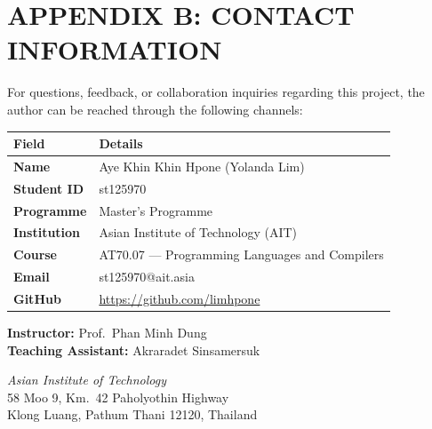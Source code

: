\chapter*{APPENDIX B: CONTACT INFORMATION}

For questions, feedback, or collaboration inquiries regarding this project, the author can be reached through the following channels:

\vspace{1cm}

\begin{table}[h!]
\centering
\renewcommand{\arraystretch}{1.5}
\begin{tabular}{@{} l l @{}}
\toprule
\textbf{Field} & \textbf{Details} \\
\midrule
\textbf{Name}        & Aye Khin Khin Hpone (Yolanda Lim) \\
\textbf{Student ID}  & st125970 \\
\textbf{Programme}    & Master's Programme \\
\textbf{Institution} & Asian Institute of Technology (AIT) \\
\textbf{Course}      & AT70.07 --- Programming Languages and Compilers \\
\textbf{Email}       & st125970@ait.asia \\
\textbf{GitHub}      & \url{https://github.com/limhpone} \\
\bottomrule
\end{tabular}
\end{table}

\vspace{1cm}

\noindent\textbf{Instructor:} Prof.\ Phan Minh Dung \\
\textbf{Teaching Assistant:} Akraradet Sinsamersuk

\vspace{1cm}

\begin{center}
\textit{Asian Institute of Technology} \\
58 Moo 9, Km.\ 42 Paholyothin Highway \\
Klong Luang, Pathum Thani 12120, Thailand
\end{center}
